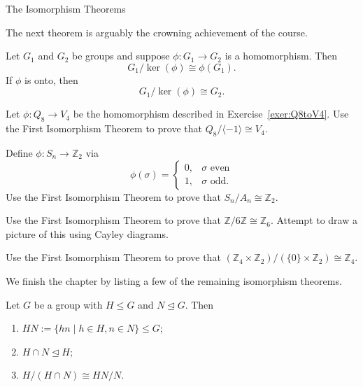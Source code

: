 \begin{section}{The Isomorphism Theorems}

The next theorem is arguably the crowning achievement of the course.

\begin{theorem}
Let $G_1$ and $G_2$ be groups and suppose $\phi:G_1\to G_2$ is a homomorphism. Then
\[
G_1/\ker(\phi)\cong \phi(G_1).
\]
If $\phi$ is onto, then
\[
G_1/\ker(\phi)\cong G_2.
\]
\end{theorem}

\begin{exercise}
Let $\phi:Q_8\to V_4$ be the homomorphism described in Exercise~\ref{exer:Q8toV4}. Use the First Isomorphism Theorem to prove that $Q_8/\langle-1\rangle\cong V_4$.
\end{exercise}

\begin{exercise}
Define $\phi:S_n\to \mathbb{Z}_2$ via
\[
\phi(\sigma)=\begin{cases}
0, & \sigma \text{ even}\\
1, & \sigma \text{ odd}.
\end{cases}
\]
Use the First Isomorphism Theorem to prove that $S_n/A_n\cong \mathbb{Z}_2$.
\end{exercise}

\begin{exercise}
Use the First Isomorphism Theorem to prove that $\mathbb{Z}/6\mathbb{Z}\cong \mathbb{Z}_6$.  Attempt to draw a picture of this using Cayley diagrams.
\end{exercise}

\begin{exercise}
Use the First Isomorphism Theorem to prove that $(\mathbb{Z}_4\times \mathbb{Z}_2)/(\{0\}\times \mathbb{Z}_2)\cong \mathbb{Z}_4$.
\end{exercise}

We finish the chapter by listing a few of the remaining isomorphism theorems.%

\begin{theorem}
Let $G$ be a group with $H\leq G$ and $N\trianglelefteq G$.  Then
\begin{enumerate}[label=\rm{(\alph*)}]
\item $HN:=\{hn\mid h\in H, n\in N\}\leq G$;
\item $H\cap N\trianglelefteq H$;
\item $\displaystyle H/(H\cap N)\cong HN/N$.
\end{enumerate}
\end{theorem}


\end{section}
